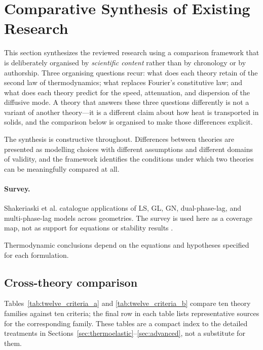 \section{Comparative Synthesis of Existing Research}
\label{sec:comparative}

This section synthesizes the reviewed research using a comparison framework that is deliberately organised by \emph{scientific content} rather than by chronology or by authorship. Three organising questions recur: what does each theory retain of the second law of thermodynamics; what replaces Fourier's constitutive law; and what does each theory predict for the speed, attenuation, and dispersion of the diffusive mode. A theory that answers these three questions differently is not a variant of another theory---it is a different claim about how heat is transported in solids, and the comparison below is organised to make those differences explicit.

The synthesis is constructive throughout. Differences between theories are presented as modelling choices with different assumptions and different domains of validity, and the framework identifies the conditions under which two theories can be meaningfully compared at all.

\paragraph{Survey.} Shakeriaski et al. catalogue applications of LS, GL, GN, dual-phase-lag, and multi-phase-lag models across geometries. The survey is used here as a coverage map, not as support for equations or stability results \cite{Shakeriaski2021}.

Thermodynamic conclusions depend on the equations and hypotheses specified for each formulation.

\subsection{Cross-theory comparison}
\label{sec:12.1}

Tables~\ref{tab:twelve_criteria_a} and \ref{tab:twelve_criteria_b} compare ten theory families against ten criteria; the final row in each table lists representative sources for the corresponding family. These tables are a compact index to the detailed treatments in Sections~\ref{sec:thermoelastic}--\ref{sec:advanced}, not a substitute for them.

